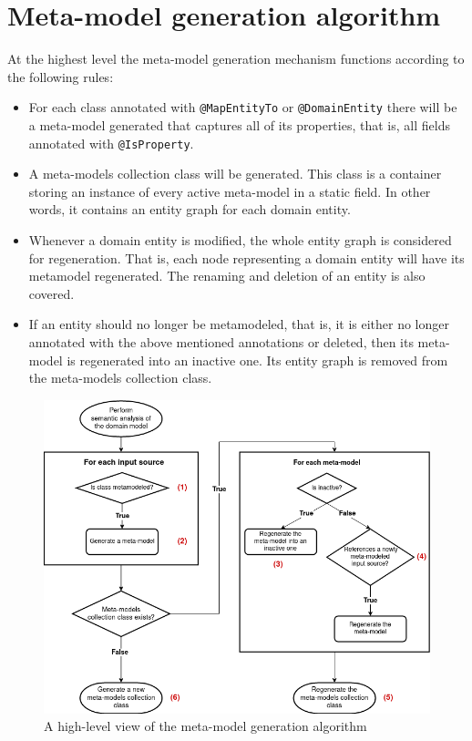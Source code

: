 \section{Meta-model generation algorithm}
At the highest level the meta-model generation mechanism functions according to the following rules:
\begin{itemize}
    \item For each class annotated with \texttt{@MapEntityTo} or \texttt{@DomainEntity} there will be a meta-model generated that captures all of its properties, that is, all fields annotated with \texttt{@IsProperty}.
    \item A meta-models collection class will be generated. This class is a container storing an instance of every active meta-model in a static field. In other words, it contains an entity graph for each domain entity.
    \item Whenever a domain entity is modified, the whole entity graph is considered for regeneration. That is, each node representing a domain entity will have its metamodel regenerated. The renaming and deletion of an entity is also covered.
    \item If an entity should no longer be metamodeled, that is, it is either no longer annotated with the above mentioned annotations or deleted, then its meta-model is regenerated into an inactive one. Its entity graph is removed from the meta-models collection class.
\end{itemize}


\begin{figure}[H]\centering
    \includegraphics[scale=0.55]{images/algorithm.drawio.png}
    \caption{A high-level view of the meta-model generation algorithm}\label{fig:algorithm}
\end{figure}

